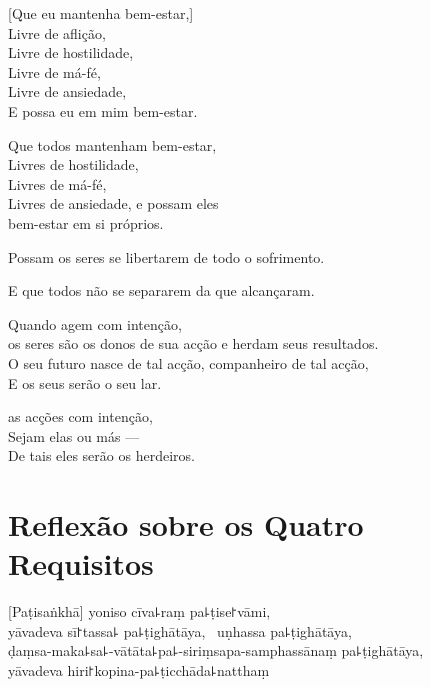 
\begin{leader}
\end{leader}

[Que eu mantenha bem-estar,]\\
Livre de aflição,\\
Livre de hostilidade,\\
Livre de má-fé,\\
Livre de ansiedade,\\
E possa eu  em mim bem-estar.

Que todos mantenham bem-estar,\\
Livres de hostilidade,\\
Livres de má-fé,\\
Livres de ansiedade, e possam eles\\
 bem-estar em si próprios.

Possam  os seres se libertarem de todo o sofrimento.

E que todos não se separarem da  que alcançaram.

Quando agem com intenção,\\
 os seres são os donos de sua acção e herdam seus resultados.\\
O seu futuro nasce de tal acção, companheiro de tal acção,\\
E os seus  serão o seu lar.

 as acções com intenção,\\
Sejam elas  ou más ---\\
De tais  eles serão os herdeiros.

\chapter[Quatro Requisitos]{Reflexão sobre os Quatro Requisitos}


\begin{leader}
\end{leader}

[Paṭisaṅkhā] yoniso cīva꜕raṃ pa꜕ṭise꜓vāmi, \pause\\
yāvadeva sī꜓tassa꜕ pa꜕ṭighātāya, \pause\ uṇhassa pa꜕ṭighātāya, \pause\\
ḍaṃsa-maka꜕sa꜕-vātāta꜕pa꜕-siriṃsapa-samphassānaṃ pa꜕ṭighātāya, \pause\\
yāvadeva hiri꜓kopina-pa꜕ṭicchāda꜕natthaṃ

